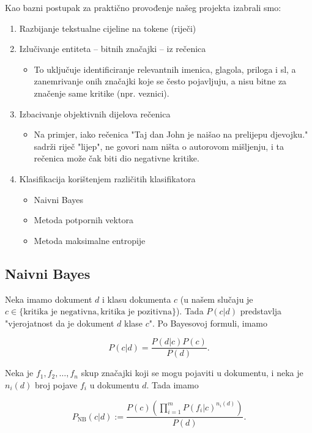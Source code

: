 \documentclass[12pt,a4paper,titlepage]{article}
\begin{document}
Kao bazni postupak za praktično provođenje našeg projekta izabrali smo:

\begin{enumerate}
  \item Razbijanje tekstualne cijeline na tokene (riječi)
  \item Izlučivanje entiteta -- bitnih značajki -- iz rečenica
    \begin{itemize}
      \item To uključuje identificiranje relevantnih imenica, glagola, priloga i sl, a zanemrivanje onih značajki koje se često pojavljuju, a nisu bitne za značenje same kritike (npr. veznici).
    \end{itemize}
  \item Izbacivanje objektivnih dijelova rečenica
    \begin{itemize}
      \item Na primjer, iako rečenica "Taj dan John je naišao na prelijepu djevojku." sadrži riječ "lijep", ne govori nam ništa o autorovom mišljenju, i ta rečenica može čak biti dio negativne kritike.
    \end{itemize}
  \item Klasifikacija korištenjem različitih klasifikatora
    \begin{itemize}
      \item Naivni Bayes
      \item Metoda potpornih vektora
      \item Metoda maksimalne entropije
    \end{itemize}
\end{enumerate}

\subsection{Naivni Bayes}

Neka imamo dokument $d$ i klasu dokumenta $c$ (u našem slučaju je $c \in \{\text{kritika je negativna}, \text{kritika je pozitivna}\}$). Tada $P(c|d)$ predstavlja "vjerojatnost da je dokument $d$ klase $c$". Po Bayesovoj formuli, imamo

\[
  P(c|d) = \frac{P(d|c)P(c)}{P(d)}.
\]

Neka je $f_1, f_2, \ldots, f_n$ skup značajki koji se mogu pojaviti u dokumentu, i neka je $n_i(d)$ broj pojave $f_i$ u dokumentu $d$. Tada imamo

\[
  P_\text{NB}(c|d) := \frac{P(c)\left(\prod_{i=1}^{m} P(f_i|c)^{n_i(d)}\right)}{P(d)}.
\]
\end{document}
